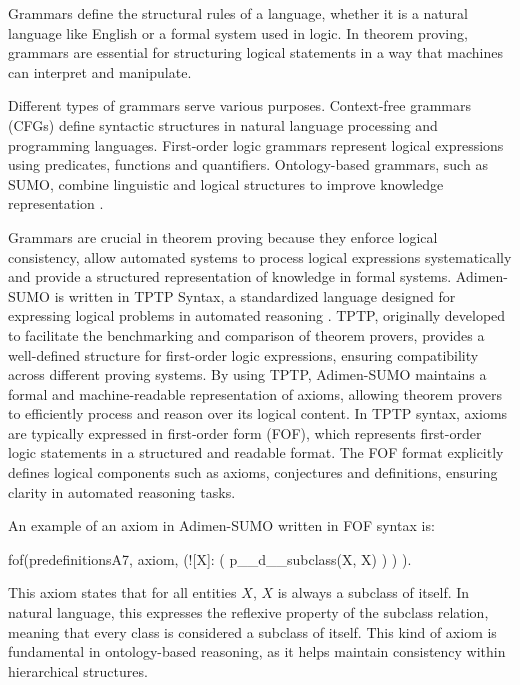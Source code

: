 \documentclass[english,version-2020-11]{uzl-thesis}
\begin{document}
Grammars define the structural rules of a language, whether it is a natural language like English or a formal system used in logic. In theorem proving, grammars are essential for structuring logical statements in a way that machines can interpret and manipulate.

Different types of grammars serve various purposes. Context-free grammars (CFGs) define syntactic structures in natural language processing and programming languages. First-order logic grammars represent logical expressions using predicates, functions and quantifiers. Ontology-based grammars, such as SUMO, combine linguistic and logical structures to improve knowledge representation \cite{Niles2001}.

Grammars are crucial in theorem proving because they enforce logical consistency, allow automated systems to process logical expressions systematically and provide a structured representation of knowledge in formal systems. Adimen-SUMO is written in TPTP Syntax, a standardized language designed for expressing logical problems in automated reasoning \cite{Alvez2014}. TPTP, originally developed to facilitate the benchmarking and comparison of theorem provers, provides a well-defined structure for first-order logic expressions, ensuring compatibility across different proving systems. By using TPTP, Adimen-SUMO maintains a formal and machine-readable representation of axioms, allowing theorem provers to efficiently process and reason over its logical content.
\newpage
In TPTP syntax, axioms are typically expressed in first-order form (FOF), which represents first-order logic statements in a structured and readable format. The FOF format explicitly defines logical components such as axioms, conjectures and definitions, ensuring clarity in automated reasoning tasks. 

An example of an axiom in Adimen-SUMO written in FOF syntax is:

\begin{Pseudocode}[morekeywords = {add, create}, deletekeywords={to}, numbers=left,
    caption = {Axiom example Adimen-SUMO}]
    fof(predefinitionsA7, axiom,
        (![X]: 
            (
                p__d__subclass(X, X)
            )
        )
    ).
\end{Pseudocode}

This axiom states that for all entities \( X \), \( X \) is always a subclass of itself. In natural language, this expresses the reflexive property of the subclass relation, meaning that every class is considered a subclass of itself. This kind of axiom is fundamental in ontology-based reasoning, as it helps maintain consistency within hierarchical structures.
\end{document}
